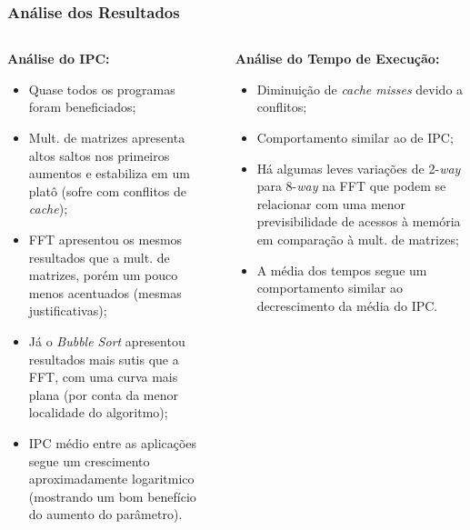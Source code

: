 \documentclass{beamer}
\begin{document}
    \begin{frame}
        \frametitle{Análise dos Resultados}

        \begin{columns}
            \begin{column}{0.45\textwidth}
                \begin{center}
                    \large
                    \textbf{Análise do IPC:}
                \end{center}

                \begin{itemize}
                    \scriptsize
                    \justifying
                    \item Quase todos os programas foram beneficiados;
                    \item Mult. de matrizes apresenta altos saltos nos primeiros aumentos e estabiliza em um platô (sofre com conflitos de \textit{cache});
                    \item FFT apresentou os mesmos resultados que a mult. de matrizes, porém um pouco menos acentuados (mesmas justificativas);
                    \item Já o \textit{Bubble Sort} apresentou resultados mais sutis que a FFT, com uma curva mais plana (por conta da menor localidade do algoritmo);
                    \item IPC médio entre as aplicações segue um crescimento aproximadamente logaritmico (mostrando um bom benefício do aumento do parâmetro).
                \end{itemize}
            \end{column}

            \begin{column}{0.01\textwidth}
                \rule{.1mm}{0.875\textheight}
            \end{column}

            \begin{column}{0.45\textwidth}
                \begin{center}
                    \large
                    \textbf{Análise do Tempo de Execução:}
                \end{center}

                \begin{itemize}
                    \scriptsize
                    \justifying
                    \item Diminuição de \textit{cache misses} devido a conflitos;
                    \item Comportamento similar ao de IPC;
                    \item Há algumas leves variações de 2-\textit{way} para 8-\textit{way} na FFT que podem se relacionar com uma menor previsibilidade de acessos à memória em comparação à mult. de matrizes;
                    \item A média dos tempos segue um comportamento similar ao decrescimento da média do IPC.
                \end{itemize}
            \end{column}
        \end{columns}
    \end{frame}
\end{document}

